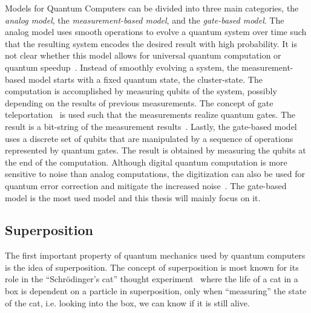 Models for Quantum Computers can be divided into three main categories, the \emph{analog model}, the \emph{measurement-based model}, and the \emph{gate-based model}. The analog model uses smooth operations to evolve a quantum system over time such that the resulting system encodes the desired result with high probability. It is not clear whether this model allows for universal quantum computation or quantum speedup~\cite{DiCh20}. Instead of smoothly evolving a system, the measurement-based model starts with a fixed quantum state, the cluster-state. The computation is accomplished by measuring qubits of the system, possibly depending on the results of previous measurements. The concept of gate teleportation~ is used such that the measurements realize quantum gates. The result is a bit-string of the measurement results~\cite{DiCh20, Niel06}. Lastly, the gate-based model uses a discrete set of qubits that are manipulated by a sequence of operations represented by quantum gates. The result is obtained by measuring the qubits at the end of the computation. Although digital quantum computation is more sensitive to noise than analog computations, the digitization can also be used for quantum error correction and mitigate the increased noise~\cite{DiCh20}. The gate-based model is the most used model and this thesis will mainly focus on it. 

\subsection{Superposition} 
The first important property of quantum mechanics used by quantum computers is the idea of superposition. The concept of superposition is most known for its role in the ``Schrödinger's cat'' thought experiment~\cite{Wine13} where the life of a cat in a box is dependent on a particle in superposition, only when ``measuring'' the state of the cat, i.e. looking into the box, we can know if it is still alive. 

